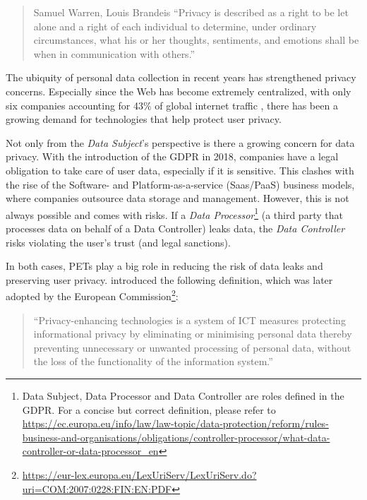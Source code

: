 \begin{quote}{Samuel Warren, Louis Brandeis}
    ``Privacy is described as a right to be let alone and a right of each individual  to  determine,  under  ordinary  circumstances,  what  his  or  her  thoughts, sentiments, and emotions shall be when in communication with others.''
\end{quote}
\noindent The ubiquity of personal data collection in recent years has strengthened privacy concerns. Especially since the Web has become extremely centralized, with only six companies accounting for 43\% of global internet traffic \citep{internet-report}, there has been a growing demand for technologies that help protect user privacy.

Not only from the \textit{Data Subject}'s perspective is there a growing concern for data privacy. With the introduction of the \gls{GDPR} in 2018, companies have a legal obligation to take care of user data, especially if it is sensitive. This clashes with the rise of the Software- and Platform-as-a-service (Saas/PaaS) business models, where companies outsource data storage and management. However, this is not always possible and comes with risks. If a \textit{Data Processor}\footnote{Data Subject, Data Processor and Data Controller are roles defined in the \gls{GDPR}. For a concise but correct definition, please refer to \url{https://ec.europa.eu/info/law/law-topic/data-protection/reform/rules-business-and-organisations/obligations/controller-processor/what-data-controller-or-data-processor_en}} (a third party that processes data on behalf of a Data Controller) leaks data, the \textit{Data Controller} risks violating the user's trust (and legal sanctions).

In both cases, \acrlong{PETs} play a big role in reducing the risk of data leaks and preserving user privacy. \citeauthor{pets-handbook} introduced the following definition, which was later adopted by the European Commission\footnote{\url{https://eur-lex.europa.eu/LexUriServ/LexUriServ.do?uri=COM:2007:0228:FIN:EN:PDF}}:
\begin{quote}{\citeauthor{pets-handbook}}
    ``Privacy-enhancing technologies is a system of ICT measures protecting informational privacy by eliminating or minimising personal data thereby preventing unnecessary or unwanted processing of personal data, without the loss of the functionality of the information system.''
\end{quote} 

